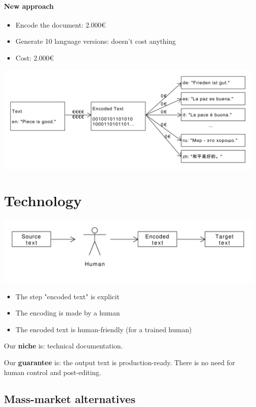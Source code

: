 \documentclass{article}
\begin{document}
\paragraph{New approach}

\begin{itemize}
\item Encode the document: 2.000€
\item Generate 10 language versions: doesn't cost anything
\item Cost: 2.000€
\end{itemize}

\includegraphics[scale=0.4]{dia/user-view-tokimani.pdf}


\section{Technology}

\includegraphics[scale=0.5]{dia/how-tokimani.pdf}

\begin{itemize}
\item The step "encoded text" is explicit
\item The encoding is made by a human
\item The encoded text is human-friendly (for a trained human)
\end{itemize}

Our \textbf{niche} is: technical documentation.

Our \textbf{guarantee} is: the output text is production-ready. There is no need for human control and post-editing.

\subsection{Mass-market alternatives}
\end{document}

